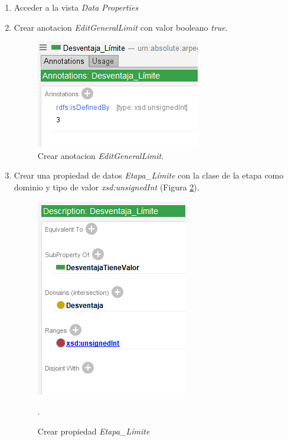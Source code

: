 \begin{enumerate}
    \item Acceder a la vista \textit{Data Properties}
    \item Crear anotacion \textit{EditGeneralLimit} con valor booleano \textit{true}.
    \begin{figure}[H]
        \centering
        \includegraphics[scale=0.6]{Figures/Protege/MultipleChoice_3.png}
        \caption{Crear anotacion \textit{EditGeneralLimit}.}
        \label{MultipleChoice_3}
    \end{figure}

    \item Crear una propiedad de datos \textit{Etapa\_Límite} con la clase de la etapa como dominio y tipo de valor 
    \textit{xsd:unsignedInt} (Figura \ref*{MultipleChoice_2}).
    \begin{figure}[H]
        \centering
        \includegraphics[scale=0.6]{Figures/Protege/MultipleChoice_2.png}
        \caption{Crear propiedad \textit{Etapa\_Límite}}.
        \label{MultipleChoice_2}
    \end{figure}
    

\end{enumerate}
